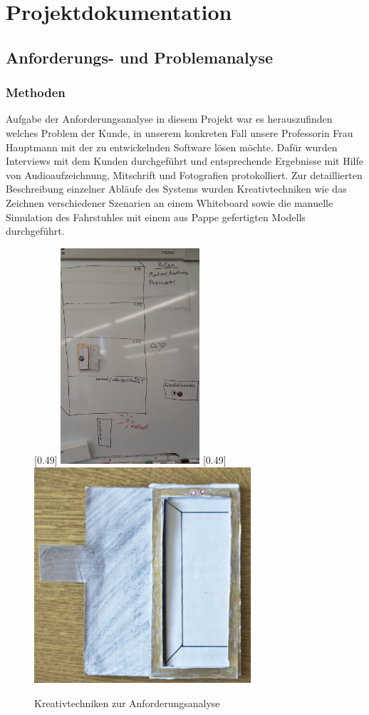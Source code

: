 \part{Projektdokumentation}
\chapter{Anforderungs- und Problemanalyse}
\section{Methoden}
Aufgabe der Anforderungsanalyse in diesem Projekt war es herauszufinden
welches Problem der Kunde, in unserem konkreten Fall unsere Professorin Frau 
Hauptmann mit der zu entwickelnden Software lösen möchte. Dafür wurden 
Interviews mit dem Kunden durchgeführt und entsprechende Ergebnisse mit Hilfe 
von Audioaufzeichnung, Mitschrift und Fotografien protokolliert. Zur 
detaillierten Beschreibung einzelner Abläufe des Systems wurden 
Kreativtechniken wie das Zeichnen verschiedener Szenarien an einem Whiteboard 
sowie die manuelle Simulation des Fahrstuhles mit einem aus Pappe gefertigten Modells durchgeführt.
\begin{figure}[hbt]
\centering
{}[0.49\linewidth]
{\includegraphics[height=8cm]{images/kundengespraech1.jpg}}
[0.49\linewidth]
{\includegraphics[height=8cm]{images/pappfahrstuhl.jpg}}
\caption{Kreativtechniken zur Anforderungsanalyse}
\end{figure}
